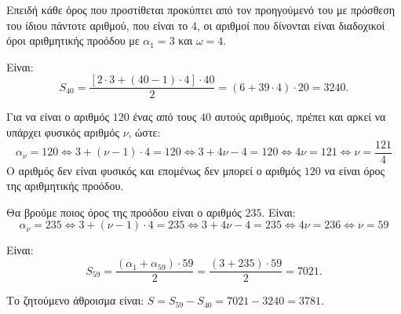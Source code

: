 
\begin{alist}
\item Επειδή κάθε όρος που προστίθεται προκύπτει από τον προηγούμενό του με πρόσθεση του ίδιου πάντοτε αριθμού, που είναι το $4$, οι αριθμοί που δίνονται είναι διαδοχικοί όροι αριθμητικής προόδου με $\alpha_1 = 3$ και $\omega = 4$.

\item Είναι:
\[S_{40} = \dfrac{[2 \cdot 3 + (40 - 1) \cdot 4] \cdot 40}{2} = (6 + 39 \cdot 4) \cdot 20 = 3240.\]

\item Για να είναι ο αριθμός $120$ ένας από τους $40$ αυτούς αριθμούς, πρέπει και αρκεί να υπάρχει φυσικός αριθμός $\nu$, ώστε:
\[\alpha_\nu = 120 \Leftrightarrow 3 + (\nu - 1) \cdot 4 = 120 \Leftrightarrow 3 + 4\nu - 4 = 120 \Leftrightarrow 4\nu = 121 \Leftrightarrow \nu = \dfrac{121}{4}\]
Ο αριθμός δεν είναι φυσικός και επομένως δεν μπορεί ο αριθμός $120$ να είναι όρος της αριθμητικής προόδου.

\item Θα βρούμε ποιος όρος της προόδου είναι ο αριθμός $235$. Είναι:
\[\alpha_\nu = 235 \Leftrightarrow 3 + (\nu - 1) \cdot 4 = 235 \Leftrightarrow 3 + 4\nu - 4 = 235 \Leftrightarrow 4\nu = 236 \Leftrightarrow \nu = 59\]

Είναι:
\[S_{59} = \dfrac{(\alpha_1 + \alpha_{59}) \cdot 59}{2} = \dfrac{(3 + 235) \cdot 59}{2} = 7021.\]

Το ζητούμενο άθροισμα είναι:
$S = S_{59} - S_{40} = 7021 - 3240 = 3781$.
\end{alist}

